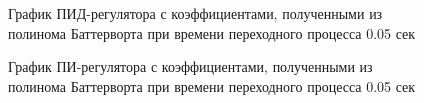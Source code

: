 \begin{figure}[h]
	\noindent{}
	\caption{График ПИД-регулятора с коэффициентами, полученными из полинома Баттерворта при времени переходного процесса 0.05 сек }
	\label{pidmod2}
\end{figure}

\begin{figure}[h]
	\noindent{}
	\caption{График ПИ-регулятора с коэффициентами, полученными из полинома Баттерворта при времени переходного процесса 0.05 сек }
	\label{pimod2}
\end{figure}